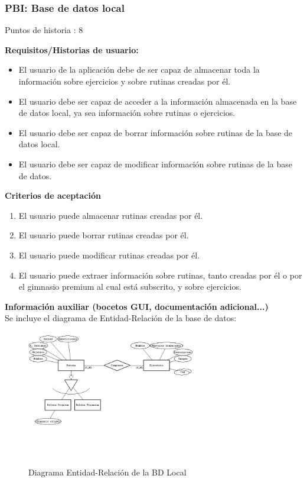 \documentclass[11pt,a4paper]{report}
\begin{document}
\subsubsection{PBI: Base de datos local}
Puntos de historia : 8
\par\textbf{Requisitos/Historias de usuario:}
\begin{itemize}
	\item El usuario de la aplicación debe de ser capaz de almacenar toda la información sobre ejercicios y sobre rutinas creadas por él.
	\item El usuario debe ser capaz de acceder a la información almacenada en la base de datos local, ya sea información sobre rutinas o ejercicios.
	\item El usuario debe ser capaz de borrar información sobre rutinas de la base de datos local.
	\item El usuario debe ser capaz de modificar información sobre rutinas de la base de datos.
\end{itemize}
\par\textbf{Criterios de aceptación}
\begin{enumerate}
	\item El usuario puede almacenar rutinas creadas por él.
	\item El usuario puede borrar rutinas creadas por él.
	\item El usuario puede modificar rutinas creadas por él.
	\item El usuario puede extraer información sobre rutinas, tanto creadas por él o por el gimnasio premium al cual está subscrito, y sobre ejercicios.
\end{enumerate}
\par\textbf{Información auxiliar (bocetos GUI, documentación adicional...)}
\\Se incluye el diagrama de Entidad-Relación de la base de datos:
\begin{figure}[H]
	\centering
	\includegraphics[width=0.7\textwidth]{capturicas/er.jpg}
	\caption{Diagrama Entidad-Relación de la BD Local}
	\label{fig: er}
\end{figure}
\end{document}

